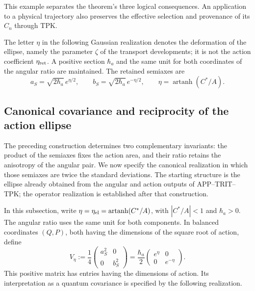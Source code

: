 This example separates the theorem's three logical consequences. An
application to a physical trajectory also preserves the effective selection and
provenance of its \(C_n\) through TPK.

The letter \(\eta\) in the following Gaussian realization denotes
the deformation of the ellipse, namely the parameter \(\zeta\) of the
transport developments; it is not the action coefficient
\(\eta_{\rm ret}\). A positive section \(\hbar_a\) and
the same unit for both coordinates of the angular ratio are maintained.
The retained semiaxes are
\[
 a_S=\sqrt{2\hbar_a}\,e^{\eta/2},\qquad
 b_S=\sqrt{2\hbar_a}\,e^{-\eta/2},\qquad
 \eta=\operatorname{artanh}(C^*/A).
\]

\subsection{Canonical covariance and reciprocity of the action ellipse}
\label{md:antmem:covarianza-accion}

The preceding construction determines two complementary invariants:
the product of the semiaxes fixes the action area, and their ratio retains
the anisotropy of the angular pair. We now specify the canonical realization
in which those semiaxes are twice the standard deviations. The starting
structure is the ellipse already obtained from the angular and action
outputs of APP--TRIT--TPK; the operator realization is established after
that construction.

In this subsection, write \(\eta=\eta_{\rm el}
=\operatorname{artanh}(C^*/A)\), with \(|C^*/A|<1\) and
\(\hbar_a>0\). The angular ratio uses the same unit for both
components. In balanced coordinates \((Q,P)\), both having the dimensions
of the square root of action, define
\begin{equation}
 V_\eta:=\frac14
 \begin{pmatrix}a_S^2&0\\0&b_S^2\end{pmatrix}
 =\frac{\hbar_a}{2}
 \begin{pmatrix}e^\eta&0\\0&e^{-\eta}\end{pmatrix}.
 \label{md:antmem:covarianza-geometrica}
\end{equation}
This positive matrix has entries having the dimensions of action. Its interpretation
as a quantum covariance is specified by the following realization.


